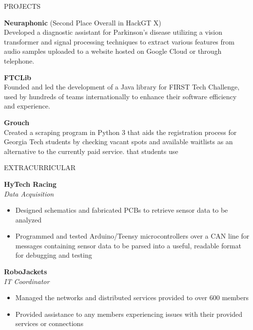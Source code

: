 \documentclass{resume} %
\begin{document}
\vspace{-0.8em}
\begin{rSection}{PROJECTS}
\vspace{-1.25em}
\item \textbf{Neuraphonic} (Second Place Overall in HackGT X)\\
Developed a diagnostic assistant for Parkinson's disease utilizing a vision transformer and signal processing techniques to extract
various features from audio samples uploaded to a website hosted on Google Cloud or through telephone.
\vspace{-0.5em}
\item \textbf{FTCLib}\\
Founded and led the development of a Java library for FIRST Tech Challenge, used by hundreds of teams internationally
to enhance their software efficiency and experience.
\vspace{-0.5em}
\item \textbf{Grouch}\\
Created a scraping program in Python 3 that aids the registration process for Georgia Tech students by
checking vacant spots and available waitlists as an alternative to the currently paid service.
that students use
\end{rSection}

\vspace{-0.8em}
\begin{rSection}{EXTRACURRICULAR}
\vspace{-1.25em}
\item \textbf{HyTech Racing}\\
\textit{Data Acquisition}
\vspace{-0.5em}
 \begin{itemize}
    \itemsep -5pt {} 
    \item Designed schematics and fabricated PCBs to retrieve sensor data to be analyzed
    \item Programmed and tested Arduino/Teensy microcontrollers over a CAN line for
    messages containing sensor data to be parsed into a useful, readable format for debugging and testing
 \end{itemize}
\vspace{-0.5em}
\item \textbf{RoboJackets}\\
\textit{IT Coordinator}
\vspace{-0.5em}
 \begin{itemize}
    \itemsep -5pt {} 
    \item Managed the networks and distributed services provided to over 600 members
    \item Provided assistance to any members experiencing issues with their provided services or connections
 \end{itemize}
\end{rSection}
\end{document}
